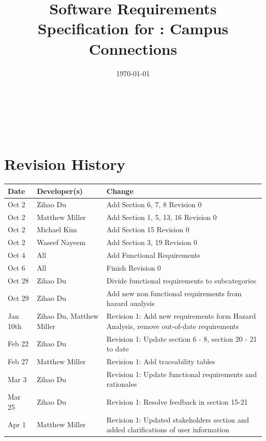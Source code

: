 \documentclass[12pt]{article}
\begin{document}

\title{Software Requirements Specification for \progname: Campus Connections} 
\author{\authname}
\date{\today}
	
\maketitle

~\newpage


\tableofcontents

~\newpage

\section*{Revision History}

\begin{tabularx}{\textwidth}{p{3cm}p{3cm}X}
\toprule {\textbf{Date}} & {\textbf{Developer(s)}} & {\textbf{Change}}\\
\midrule
Oct 2 & Zihao Du & Add Section 6, 7, 8 Revision 0\\
Oct 2 & Matthew Miller & Add Section 1, 5, 13, 16 Revision 0\\
Oct 2 & Michael Kim & Add Section 15 Revision 0\\
Oct 2 & Waseef Nayeem & Add Section 3, 19 Revision 0\\
Oct 4 & All & Add Functional Requirements\\
Oct 6 & All & Finish Revision 0\\
Oct 28 & Zihao Du & Divide functional requirements to subcategories\\
Oct 29 & Zihao Du & Add new non functional requirements from hazard analysis\\
Jan 10th & Zihao Du, Matthew Miller & Revision 1: Add new requirements form Hazard Analysis, remove out-of-date requirements\\
Feb 22 & Zihao Du & Revision 1: Update section 6 - 8, section 20 - 21 to date\\
Feb 27 & Matthew Miller & Revision 1: Add traceability tables\\
Mar 3 & Zihao Du & Revision 1: Update functional requirements and rationales\\
Mar 25 & Zihao Du & Revision 1: Resolve feedback in section 15-21\\
Apr 1 & Matthew Miller & Revision 1: Updated stakeholders section and added clarifications of user information\\
\bottomrule
\end{tabularx}
\end{document}
